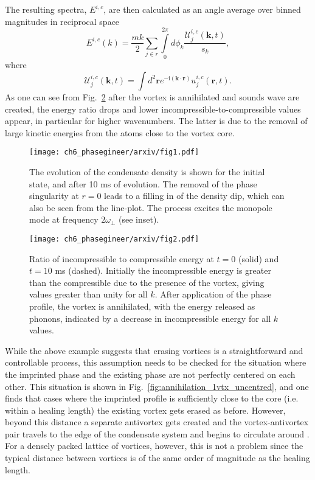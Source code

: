 The resulting spectra, $E^{i,c}$, are then calculated as an angle average over binned magnitudes in reciprocal space \cite{CT:Bradley_prx_2012}
\begin{equation}
    E^{i,c}(k) = \frac{mk}{2}\displaystyle\sum_{j\in r}\int\limits_{0}^{2\pi} d\phi_k \frac{\mathcal{U}^{i,c}_j(\mathbf{k},t)}{s_k},
\end{equation}
where
\begin{equation}
    \mathcal{U}^{i,c}_{j}(\mathbf{k},t) = \int d^2\mathbf{r}e^{-\text{i}(\mathbf{k}\cdot \mathbf{r})}u_j^{i,c}(\mathbf{r},t).
\end{equation}
As one can see from Fig.~\ref{fig:kinspec} after the vortex is annihilated and sounds wave are created, the energy ratio drops and lower incompressible-to-compressible values appear, in particular for higher wavenumbers. The latter is due to the removal of large kinetic energies from the atoms close to the vortex core.

\begin{figure}[h!]\centering
    \texttt{[image: ch6\_phasegineer/arxiv/fig1.pdf]}
    \caption{The evolution of the condensate density is shown for the initial state, and after 10 ms of evolution. The removal of the phase singularity at $r=0$ leads to a filling in of the density dip, which can also be seen from the line-plot. The process excites the monopole mode at frequency $2\omega_\perp$ (see inset).}\label{fig:annihilation_1vtx}
\end{figure}
\begin{figure}[h!]\centering
    \texttt{[image: ch6\_phasegineer/arxiv/fig2.pdf]}
    \caption{Ratio of incompressible to compressible energy at  $t=0$ (solid) and $t=10$ ms (dashed). Initially the incompressible energy is greater than the compressible due to the presence of the vortex, giving values greater than unity for all $k$. After application of the phase profile, the vortex is annihilated, with the energy released as phonons, indicated by a decrease in incompressible energy for all $k$ values.}\label{fig:kinspec}
\end{figure}

While the above example suggests that erasing vortices is a straightforward and controllable process, this assumption needs to be checked for the situation where the imprinted phase and the existing phase are not perfectly centered on each other. This situation is shown in Fig.~\ref{fig:annihilation_1vtx_uncentred}, and one finds that cases where the imprinted profile is sufficiently close to the core (i.e. within a healing length) the existing vortex gets erased as before. However, beyond this distance a separate antivortex gets created and the vortex-antivortex pair travels to the edge of the condensate system and begins to circulate around \cite{VTX:Martikainen_pra_2001}. For a densely packed lattice of vortices, however, this is not a problem since the typical distance between vortices is of the same order of magnitude as the healing length.

